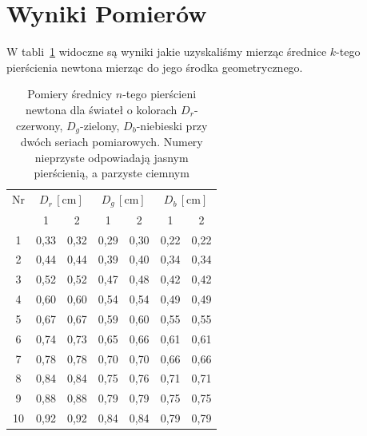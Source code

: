 \documentclass[12pt]{article}
\begin{document}
\section{Wyniki Pomierów}
W tabli~\ref{tab:rgb_measurements_reversed} widoczne są wyniki jakie uzyskaliśmy mierząc średnice \(k\)-tego pierścienia newtona mierząc do jego środka geometrycznego.
\begin{table}[H]
	\centering
	\begin{tabular}{c|cc|cc|cc}
		\toprule
        Nr & \multicolumn{2}{c|}{\(D_r \, [\mathrm{cm}]\)} & \multicolumn{2}{c|}{\(D_g \, [\mathrm{cm}]\)} & \multicolumn{2}{c}{\(D_b \, [\mathrm{cm}]\)}                            \\
		   & 1                            & 2                            & 1                           & 2      & 1      & 2      \\
		\midrule
		1  & 0{,}33                       & 0{,}32                       & 0{,}29                      & 0{,}30 & 0{,}22 & 0{,}22 \\
		2  & 0{,}44                       & 0{,}44                       & 0{,}39                      & 0{,}40 & 0{,}34 & 0{,}34 \\
		3  & 0{,}52                       & 0{,}52                       & 0{,}47                      & 0{,}48 & 0{,}42 & 0{,}42 \\
		4  & 0{,}60                       & 0{,}60                       & 0{,}54                      & 0{,}54 & 0{,}49 & 0{,}49 \\
		5  & 0{,}67                       & 0{,}67                       & 0{,}59                      & 0{,}60 & 0{,}55 & 0{,}55 \\
		6  & 0{,}74                       & 0{,}73                       & 0{,}65                      & 0{,}66 & 0{,}61 & 0{,}61 \\
		7  & 0{,}78                       & 0{,}78                       & 0{,}70                      & 0{,}70 & 0{,}66 & 0{,}66 \\
		8  & 0{,}84                       & 0{,}84                       & 0{,}75                      & 0{,}76 & 0{,}71 & 0{,}71 \\
		9  & 0{,}88                       & 0{,}88                       & 0{,}79                      & 0{,}79 & 0{,}75 & 0{,}75 \\
		10 & 0{,}92                       & 0{,}92                       & 0{,}84                      & 0{,}84 & 0{,}79 & 0{,}79 \\
		\bottomrule
	\end{tabular}
	\caption{Pomiery średnicy \(n\)-tego pierścieni newtona dla świateł o kolorach \(D_r\)-czerwony, \(D_g\)-zielony, \(D_b\)-niebieski przy dwóch seriach pomiarowych. Numery nieprzyste odpowiadają jasnym pierścienią, a parzyste ciemnym}
	\label{tab:rgb_measurements_reversed}
\end{table}
\end{document}

